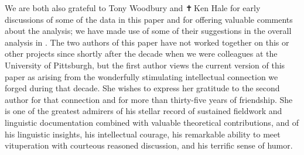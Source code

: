 \documentclass[output=paper,colorlinks,citecolor=brown]{langscibook}
\begin{document}
   We are both also grateful to Tony Woodbury and ✝\,Ken Hale for
   early discussions of some of the data in this paper and for
   offering valuable comments about the analysis; we have made use of
   some of their suggestions in the overall analysis in .  
   The two authors of this paper have not worked together on this or
   other projects since shortly after the decade when we were
   colleagues at the University of Pittsburgh, but the first author
   views the current version of this paper as arising from the
   wonderfully stimulating intellectual connection we forged during
   that decade.  She wishes to express her gratitude to the second
   author for that connection and for more than thirty-five years of
   friendship.  She is one of the greatest admirers of his stellar
   record of sustained fieldwork and linguistic documentation
   combined with valuable theoretical contributions, and of his
   linguistic insights, his intellectual courage, his remarkable
   ability to meet vituperation with courteous reasoned discussion,
   and his terrific sense of humor.

\printbibliography[heading=subbibliography,notkeyword=this]
\end{document}
